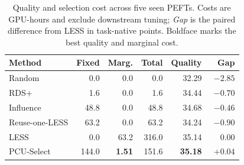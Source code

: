 \begin{table}[t]
\centering
\small
\setlength{\tabcolsep}{2pt}
\begin{tabular}{lrrrrr}
\toprule
Method & Fixed & Marg. & Total & Quality & Gap \\
\midrule
Random          &  0.0 &  0.0 &   0.0 & 32.29 & $-2.85$ \\
RDS+            &  1.6 &  0.0 &   1.6 & 34.44 & $-0.70$ \\
Influence       & 48.8 &  0.0 &  48.8 & 34.68 & $-0.46$ \\
Reuse-one-LESS  & 63.2 &  0.0 &  63.2 & 34.24 & $-0.90$ \\
\midrule
LESS            &  0.0 & 63.2 & 316.0 & 35.14 & $\phantom{+}0.00$ \\
PCU-Select      & 144.0 & \textbf{1.51} &  151.6 & \textbf{35.18} & $+0.04$ \\
\bottomrule
\end{tabular}
\caption{Quality and selection cost across five seen PEFTs. Costs are GPU-hours
and exclude downstream tuning; \emph{Gap} is the paired difference from
LESS in task-native points. Boldface marks the best quality and marginal cost.}
\label{tab:quality-cost-headline}
\end{table}

